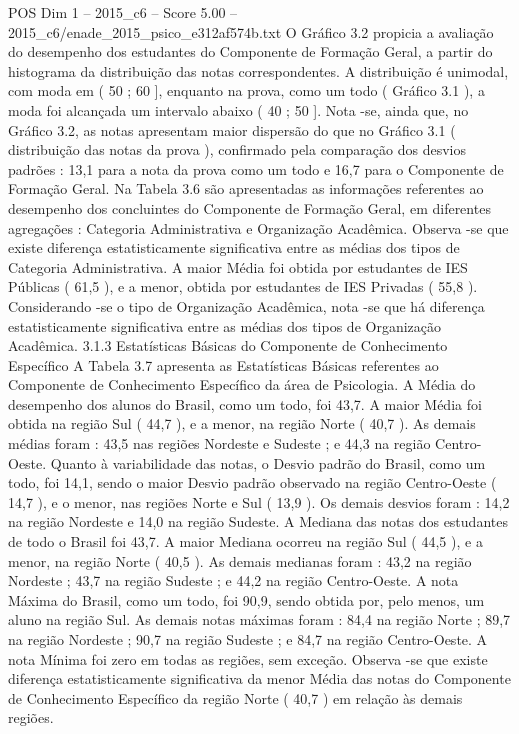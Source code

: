 \begin{textsample}{POS Dim 1 – 2015\_c6 – Score 5.00 – 2015\_c6/enade\_2015\_psico\_e312af574b.txt}
O Gráfico 3.2 propicia a avaliação do desempenho dos estudantes do Componente de Formação Geral, a partir do histograma da distribuição das notas correspondentes.
A distribuição é unimodal, com moda em ( 50 ; 60 ], enquanto na prova, como um todo ( Gráfico 3.1 ), a moda foi alcançada um intervalo abaixo ( 40 ; 50 ].
Nota -se, ainda que, no Gráfico 3.2, as notas apresentam maior dispersão do que no Gráfico 3.1 ( distribuição das notas da prova ), confirmado pela comparação dos desvios padrões : 13,1 para a nota da prova como um todo e 16,7 para o Componente de Formação Geral.
Na Tabela 3.6 são apresentadas as informações referentes ao desempenho dos concluintes do Componente de Formação Geral, em diferentes agregações : Categoria Administrativa e Organização Acadêmica.
Observa -se que existe diferença estatisticamente significativa entre as médias dos tipos de Categoria Administrativa.
A maior Média foi obtida por estudantes de IES Públicas ( 61,5 ), e a menor, obtida por estudantes de IES Privadas ( 55,8 ).
Considerando -se o tipo de Organização Acadêmica, nota -se que há diferença estatisticamente significativa entre as médias dos tipos de Organização Acadêmica. 3.1.3 Estatísticas Básicas do Componente de Conhecimento Específico A Tabela 3.7 apresenta as Estatísticas Básicas referentes ao Componente de Conhecimento Específico da área de Psicologia.
A Média do desempenho dos alunos do Brasil, como um todo, foi 43,7.
A maior Média foi obtida na região Sul ( 44,7 ), e a menor, na região Norte ( 40,7 ).
As demais médias foram : 43,5 nas regiões Nordeste e Sudeste ; e 44,3 na região Centro-Oeste.
Quanto à variabilidade das notas, o Desvio padrão do Brasil, como um todo, foi 14,1, sendo o maior Desvio padrão observado na região Centro-Oeste ( 14,7 ), e o menor, nas regiões Norte e Sul ( 13,9 ).
Os demais desvios foram : 14,2 na região Nordeste e 14,0 na região Sudeste.
A Mediana das notas dos estudantes de todo o Brasil foi 43,7.
A maior Mediana ocorreu na região Sul ( 44,5 ), e a menor, na região Norte ( 40,5 ).
As demais medianas foram : 43,2 na região Nordeste ; 43,7 na região Sudeste ; e 44,2 na região Centro-Oeste.
A nota Máxima do Brasil, como um todo, foi 90,9, sendo obtida por, pelo menos, um aluno na região Sul.
As demais notas máximas foram : 84,4 na região Norte ; 89,7 na região Nordeste ; 90,7 na região Sudeste ; e 84,7 na região Centro-Oeste.
A nota Mínima foi zero em todas as regiões, sem exceção.
Observa -se que existe diferença estatisticamente significativa da menor Média das notas do Componente de Conhecimento Específico da região Norte ( 40,7 ) em relação às demais regiões.

\end{textsample}
